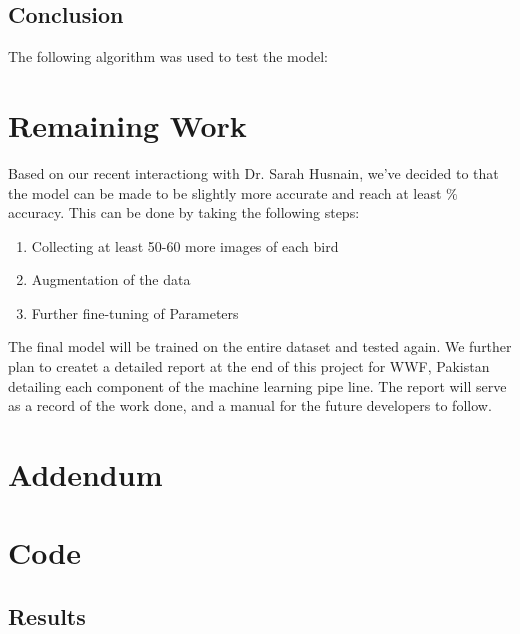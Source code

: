 \documentclass{article}
\begin{document}
    \subsection*{Conclusion}
    The following algorithm was used to test the model:


    \section*{Remaining Work}
    
    Based on our recent interactiong with Dr. Sarah Husnain, we've decided to that the model can be made to be slightly more accurate and reach at least $\%$ accuracy. This can be done by taking the following steps:
    \begin{enumerate}
        \item Collecting at least 50-60 more images of each bird
        \item Augmentation of the data
        \item Further fine-tuning of Parameters
    \end{enumerate}
    The final model will be trained on the entire dataset and tested again. We further plan to createt a detailed report at the end of this project for WWF, Pakistan detailing each component of the machine learning pipe line. The report will serve as a record of the work done, and a manual for the future developers to follow.
    
    \section*{Addendum}
    \section*{Code}
    \subsection*{Results}
\end{document}
